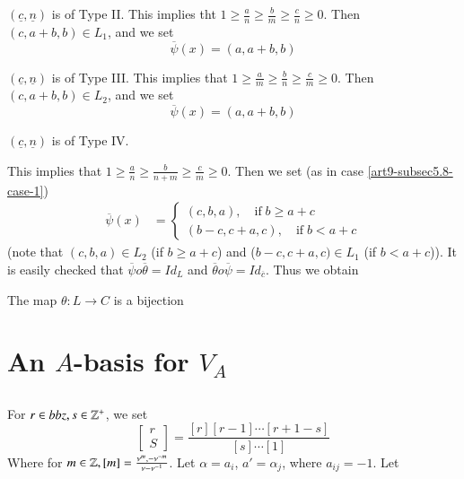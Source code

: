 \begin{case}\label{art9-subsec5.8-case-2}
$(\underline{c}, \underline{n})$ is of Type II. This implies tht $ 1 \geq \frac{a}{n} \geq \frac{b}{m} \geq \frac{c}{n} \geq 0$. Then
$(c, a+b, b) \in L_{1}$, and we set
$$
\overline{\psi}(x) = (a, a+b, b)
$$
\end{case}

\begin{case}\label{art9-subsec5.8-case-3}
$(\underline{c}, \underline{n})$ is of Type III. This implies that $ 1 \geq \frac{a}{m} \geq \frac{b}{n} \geq \frac{c}{m} \geq 0$. Then
$(c, a+b, b) \in L_{2}$, and we set
$$
\overline{\psi}(x) = (a, a+b, b)
$$
\end{case}

\begin{case}\label{art9-subsec5.8-case-4}
$(\underline{c}, \underline{n})$ is of Type IV.

This implies that $ 1 \geq \frac{a}{n} \geq \frac{b}{n+m} \geq \frac{c}{m} \geq 0$. Then we set
(as in case \ref{art9-subsec5.8-case-1})
\begin{align*}
\overline{\psi} (x) &=
\begin{cases}
(c,b,a ), \quad \text{if} \; b \geq a + c\\
(b-c, c+a, c), \quad \text{if} \; b < a + c
\end{cases}
\end{align*}
(note that $(c, b, a)\in L_{2}$ (if $ b \geq a + c$) and ($b-c, c+a, c) \in L_{1}$ (if $b < a+ c$)).  It is easily checked that $\overline{\psi} o \overline{\theta} = Id_{L}$ and $\overline{\theta}o \overline{\psi} = Id_{\overline{c}}$. Thus we obtain 
\end{case}

\setcounter{theorem}{8}
\begin{theorem}\label{art9-thm-5.9}
The map $\theta : L \rightarrow C$ is a bijection
\end{theorem}

\section{An $A$-basis for $V_{A}$}\label{art9-sec-6}

\subsection{}\label{art9-subsec-6.1}
For $r \in bbz, s \in \mathbb{Z}^{+}$, we set
$$
\begin{bmatrix}
r\\
S
\end{bmatrix}
= \frac{[r][r-1]\cdots [r + 1-s]}{[s]\cdots[1]}
$$
Where for $m \in \mathbb{Z} , [m] =\frac{\nu^{m}, -\nu^{-m}}{\nu-\nu^{-1}}$. Let $\alpha= a_{i}$, $a' = \alpha_{j}$, where $a_{ij}= -1$. Let 

